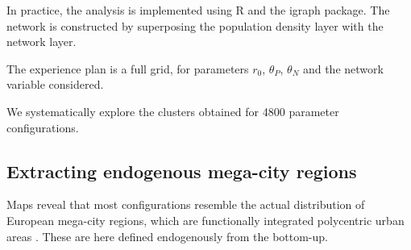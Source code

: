 \documentclass{jimis-en}
\begin{document}





In practice, the analysis is implemented using R and the igraph package. The network is constructed by superposing the population density layer with the network layer.


The experience plan is a full grid, for parameters $r_0$, $\theta_P$, $\theta_N$ and the network variable considered.








We systematically explore the clusters obtained for 4800 parameter configurations.





\subsection{Extracting endogenous mega-city regions}

Maps reveal that most configurations resemble the actual distribution of European mega-city regions, which are functionally integrated polycentric urban areas \citep{hall2006polycentric}. These are here defined endogenously from the bottom-up.

\end{document}
